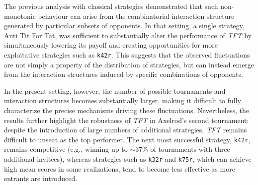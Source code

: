 \documentclass{article}
\newcommand{\TFT}{\emph{TFT}}
\newcommand{\AXL}{\texttt{Axelrod-Python}}
\newcommand{\SI}{\textbf{Supplementary Information}}
\begin{document}
The previous analysis with classical strategies demonstrated that such
non-monotonic behaviour can arise from the combinatorial interaction structure
generated by particular subsets of opponents. In that setting, a single
strategy, Anti Tit For Tat, was sufficient to substantially alter the
performance of \TFT{} by simultaneously lowering its payoff and creating
opportunities for more exploitative strategies such as \texttt{k42r}. This
suggests that the observed fluctuations are not simply a property of the
distribution of strategies, but can instead emerge from the interaction
structures induced by specific combinations of opponents.

In the present setting, however, the number of possible tournaments and
interaction structures becomes substantially larger, making it difficult to
fully characterize the precise mechanisms driving these fluctuations.
Nevertheless, the results further highlight the robustness of \TFT{} in
Axelrod's second tournament: despite the introduction of large numbers of
additional strategies, \TFT{} remains difficult to unseat as the top
performer. The next most successful strategy, \texttt{k42r}, remains competitive
(e.g., winning up to \(\sim\)37\% of tournaments with three additional
invitees), whereas strategies such as \texttt{k32r} and \texttt{k75r}, which
can achieve high mean scores in some realizations, tend to become less
effective as more entrants are introduced. \\

\begin{table}[!hbtp]
        \centering
        \resizebox{.9\textwidth}{!}{
        }
        \caption{\textbf{Proportion of wins for original strategies with 1-4 additional invitees.}
        Shown are the strategies with non zero probabilities of winning at least
        one of the
        modified tournaments under
        five fixed match lengths, repeated
        250 times. Additional
        invitees are strategies drawn from the open-source \AXL{} library; a
        full list is provided in \SI{} (S5 and S8), and source code/documentation are
        referenced therein. We consider four cases: adding 1, 2, 3, or 4 extra
        strategies to the original field. The last row reports the sum across
        these strategies (noting that some wins accrue to strategies not
        submitted to the original tournament).}
        \label{tbl:alternate_extra_strategy_tournament_winner_proportion}
\end{table}
\end{document}
